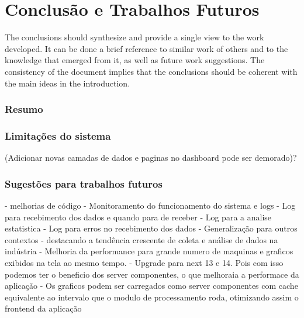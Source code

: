 \chapter{Conclusão e Trabalhos Futuros}\label{cap:conclusions}

The conclusions should synthesize and provide a single view to the work developed. It can be done a brief reference to similar work of others and to the knowledge that emerged from it, as well as future work suggestions. The consistency of the document implies that the conclusions should be coherent with the main ideas in the introduction.

\subsection[Resumo]{Resumo}

\subsection[Limitações do sistema]{Limitações do sistema}
(Adicionar novas camadas de dados e paginas no dashboard pode ser demorado)?

\subsection[Sugestões para trabalhos futuros]{Sugestões para trabalhos futuros}

- melhorias de código
- Monitoramento do funcionamento do sistema e logs
    - Log para recebimento dos dados e quando para de receber
    - Log para a analise estatistica
    - Log para erros no recebimento dos dados
- Generalização para outros contextos - destacando a tendência crescente de coleta e análise de dados na indústria
- Melhoria da performance para grande numero de maquinas e graficos exibidos na tela ao mesmo tempo.
- Upgrade para next 13 e 14. Pois com isso podemos ter o beneficio dos server componentes, o que melhoraia a performace da aplicação - Os graficos podem ser carregados como server componentes com cache equivalente ao intervalo que o modulo de processamento roda, otimizando assim o frontend da aplicação





